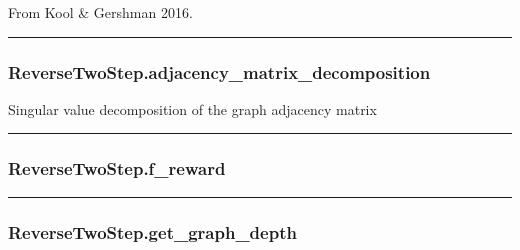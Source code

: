 \begin{Shaded}
\begin{Highlighting}[]
\end{Highlighting}
\end{Shaded}

From Kool \& Gershman 2016.

\begin{center}\rule{0.5\linewidth}{\linethickness}\end{center}

\hypertarget{reversetwostep.adjacency_matrix_decomposition}{%
\subsubsection{ReverseTwoStep.adjacency\_matrix\_decomposition}\label{reversetwostep.adjacency_matrix_decomposition}}

\begin{Shaded}
\begin{Highlighting}[]
\NormalTok{)}
\end{Highlighting}
\end{Shaded}

Singular value decomposition of the graph adjacency matrix

\begin{center}\rule{0.5\linewidth}{\linethickness}\end{center}

\hypertarget{reversetwostep.f_reward}{%
\subsubsection{ReverseTwoStep.f\_reward}\label{reversetwostep.f_reward}}

\begin{Shaded}
\begin{Highlighting}[]
\end{Highlighting}
\end{Shaded}

\begin{center}\rule{0.5\linewidth}{\linethickness}\end{center}

\hypertarget{reversetwostep.get_graph_depth}{%
\subsubsection{ReverseTwoStep.get\_graph\_depth}\label{reversetwostep.get_graph_depth}}

